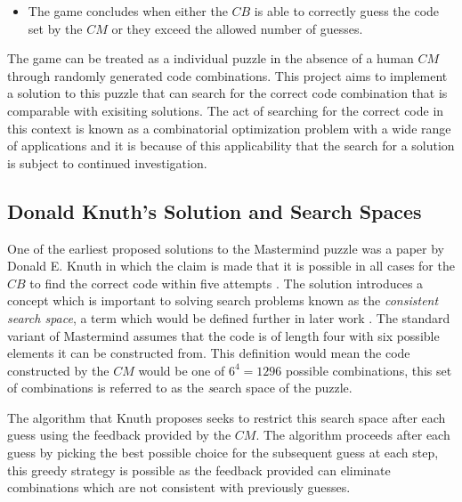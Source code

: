 \documentclass[12pt]{article}  %
\theoremstyle{definition}
\theoremstyle{remark}
\begin{document}
\begin {itemize}
\begin{figure}[H]
	\caption{A simplified representation of $CB$ attempting to break the code set by $CM$}
	\end{figure}
	\item {The game concludes when either the $CB$ is able to correctly guess the code set by the $CM$ or they exceed the allowed number of guesses.}
\end {itemize}

The game can be treated as a individual puzzle in the absence of a human $CM$ through randomly generated code combinations. This project aims to implement a solution to this puzzle that can search for the correct code combination that is comparable with exisiting solutions. The act of searching for the correct code in this context is known as a combinatorial optimization problem with a wide range of applications \cite{Haystack} and it is because of this applicability that the search for a solution is subject to continued investigation.


\subsection {Donald Knuth's Solution and Search Spaces}
\par One of the earliest proposed solutions to the Mastermind puzzle was a paper by Donald E. Knuth in which the claim is made that it is possible in all cases for the $CB$ to find the correct code within five attempts \cite {Wolfram} \cite {Knuth}. The solution introduces a concept which is important to solving search problems known as the \emph{consistent search space}, a term which would be defined further in later work \cite{Merelo}. The standard variant of Mastermind assumes that the code is of length four with six possible elements it can be constructed from. This definition would mean the code constructed by the $CM$ would be one of $6^4 = 1296$ possible combinations, this set of combinations is referred to as the \emph search space of the puzzle. 

\par The algorithm that Knuth proposes seeks to restrict this search space after each guess using the feedback provided by the $CM$. The algorithm proceeds after each guess by picking the best possible choice for the subsequent guess at each step, this greedy strategy \cite {Wolfram} is possible as the feedback provided can eliminate combinations which are not consistent with previously guesses. 
\end{document}
